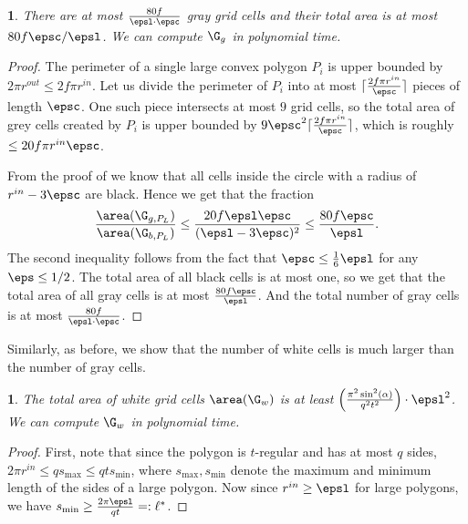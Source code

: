 \documentclass[10pt,a4paper]{article}
\theoremstyle{plain}
\theoremstyle{plain}
\newtheorem{lem}[theorem]{\protect\lemmaname}
\theoremstyle{plain}
\theoremstyle{definition}
\providecommand{\lemmaname}{Lemma}
\def\rem#1{{\marginpar{\raggedright\scriptsize #1}}}
\newcommand{\awr}[1]{\rem{\textcolor{orange}{$\bullet$ #1}}}
\begin{document}
{\begin{lem} \label{lem:gray-circles-polygon}
There are at most $\frac{80 f}{\epsl \cdot \epsc}$ gray grid cells and their total area is at most~$80 f \epsc/ \epsl$.
 We can compute $\G_g$ in polynomial time.
\end{lem} 
\begin{proof}
	The perimeter of a single large convex polygon $P_i$ is upper bounded by $2 \pi r^{out} \le 2 f \pi r^{in}$. Let us divide the perimeter of $P_i$ into at most $\lceil\frac{2 f \pi r^{in}}{\epsc}\rceil$ pieces of length $\epsc$.
	One such piece intersects at most $9$ grid cells, so the total area of grey cells created by $P_i$ is upper bounded by $9 \epsc^2 \lceil\frac{2 f \pi r^{in}}{\epsc}\rceil$, which is roughly  $\le 20f\pi r^{in}\epsc$. 
	
	From the proof of  we know that all cells inside the circle with a radius of $r^{in}- 3\epsc$ are black. Hence we get that the fraction \[
	\frac{\area(\G_{g, P_L})}{\area(\G_{b, P_L})} \leq \frac{20 f \epsl \epsc}{(\epsl - 3 \epsc)^2} \leq \frac{80 f \epsc}{\epsl}.
	\]
	The second inequality follows from the fact that $\epsc \leq \frac{1}{6} \epsl$ for any $\eps \leq 1/2$.  
	The total area of all black cells is at most one, so we get that the total area of all gray cells is at most $\frac{80 f \epsc}{\epsl}$.
 And the total number of gray cells is at most $\frac{80 f}{\epsl \cdot \epsc}$.

\end{proof}


Similarly, as before, we show that the number of white cells is much larger than the number of gray cells.

\begin{lem} \label{lem:white-polygons}
	The total area of white grid cells $\area(\G_{w})$ is at least %
 $\left ( \frac{\pi^2 \sin^2(\alpha)}{q^2 t^2} \right )\cdot \epsl^2$. 
 We can compute $\G_w$ in polynomial time.
\end{lem}
\begin{proof}
First, note that since the polygon is $t$-regular and has at most $q$ sides, 
	$2\pi r^{in} \le q s_{\max} \le q t s_{\min}$, where $s_{\max}, s_{\min}$ denote the maximum and minimum length of the sides of a large polygon.
	Now since $r^{in} \ge \epsl$ for large polygons, we have $s_{\min} \ge \frac{2\pi \epsl}{q t}=:\ell^*$.


\end{proof}}
\end{document}

